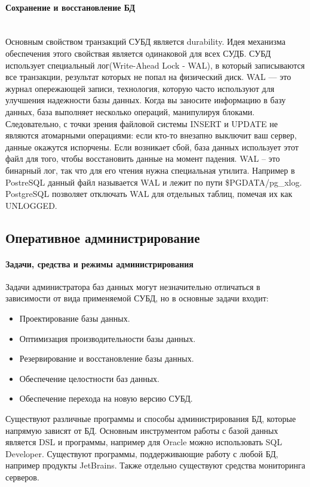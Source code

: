 \paragraph{Сохранение и восстановление БД}~\\
Основным свойством транзакций СУБД является durability. Идея механизма обеспечения этого свойствая является одинаковой для всех СУДБ. СУБД использует специальный лог(Write-Ahead Lock - WAL), в который записываются все транзакции, результат которых не попал на физический диск. WAL — это журнал опережающей записи, технология, которую часто используют для улучшения надежности базы данных. Когда вы заносите информацию в базу данных, база выполняет несколько операций, манипулируя блоками.
Следовательно, с точки зрения файловой системы INSERT и UPDATE не являются атомарными операциями: если кто-то внезапно выключит ваш сервер, данные окажутся испорчены. Если возникает сбой, база данных использует этот файл для того, чтобы восстановить данные на момент падения. WAL -- это бинарный лог, так что для его чтения нужна специальная утилита.
Например в PostreSQL данный файл называется WAL и лежит по пути \$PGDATA/pg\_xlog. 
PostgreSQL позволяет отключать WAL для отдельных таблиц, помечая их как UNLOGGED.

\subsection{Оперативное администрирование}
\paragraph{Задачи, средства и режимы администрирования}

Задачи администратора баз данных могут незначительно отличаться в зависимости от вида применяемой СУБД, но в основные задачи входит:
\begin{itemize}
    \item Проектирование базы данных.
    \item Оптимизация производительности базы данных.
    \item Резервирование и восстановление базы данных.
    \item Обеспечение целостности баз данных.
    \item Обеспечение перехода на новую версию СУБД.
\end{itemize}
Существуют различные программы и способы администрирования БД, которые напрямую зависят от БД. Основным инструментом работы с базой данных является DSL и программы, например для Oracle можно использовать SQL Developer. Существуют программы, поддерживающие работу с любой БД, например продукты JetBrains.  Также отдельно существуют средства мониторинга серверов. 

